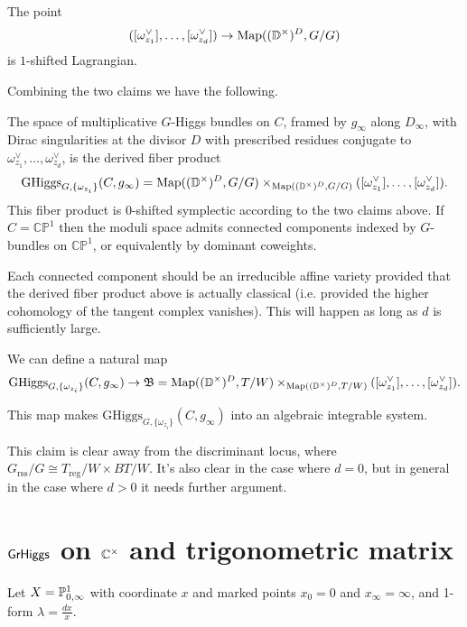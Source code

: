 \documentclass[12pt,psamsfonts,reqno]{amsart}
\begin{document}
\begin{claim}
The point 
\[([\omega_{z_1}^\vee], \ldots, [\omega_{z_d}^\vee]) \to \operatorname{Map}((\mathbb{D}^\times)^D, G/G)\]
is $1$-shifted Lagrangian.
\end{claim}

Combining the two claims we have the following.

\begin{definition}
The space of multiplicative $G$-Higgs bundles on $C$, framed by $g_\infty$ along $D_\infty$, with Dirac singularities at the divisor $D$ with prescribed residues conjugate to $\omega_{z_1}^\vee, \ldots, \omega_{z_d}^\vee$, is the derived fiber product
\[\mathrm{GHiggs}_{G, \{\omega_{z_i}\}}(C, g_\infty) =  \operatorname{Map}((\mathbb{D}^\times)^D, G/G) \times_{\operatorname{Map}((\mathbb{D}^\times)^D, G/G)} ([\omega_{z_1}^\vee], \ldots, [\omega_{z_d}^\vee]).\]
This fiber product is 0-shifted symplectic according to the two claims above.  If $C = \mathbb{CP}^1$ then the moduli space admits connected components indexed by $G$-bundles on $\mathbb{CP}^1$, or equivalently by dominant coweights.
\end{definition}

Each connected component should be an irreducible affine variety provided that the derived fiber product above is actually classical (i.e. provided the higher cohomology of the tangent complex vanishes).  This will happen as long as $d$ is sufficiently large.

We can define a natural map
\[\mathrm{GHiggs}_{G, \{\omega_{z_i}\}}(C, g_\infty) \to \mathfrak{B} =  \operatorname{Map}((\mathbb{D}^\times)^D, T/W) \times_{\operatorname{Map}((\mathbb{D}^\times)^D, T/W)} ([\omega_{z_1}^\vee], \ldots, [\omega_{z_d}^\vee]).\]

\begin{claim}
This map makes $\mathrm{GHiggs}_{G, \{\omega_{z_i}\}}(C, g_\infty)$ into an algebraic integrable system.
\end{claim}

This claim is clear away from the discriminant locus, where $G_{\mathrm{rss}}/G \cong T_{\mathrm{reg}}/W \times BT/W$.  It's also clear in the case where $d=0$, but in general in the case where $d > 0$ it needs further argument.


\section{$\mathsf{GrHiggs}$ on $\mathbb C^{\times}$ and trigonometric matrix}

Let $X = \mathbb P^{1}_{0,\infty}$ with coordinate $x$ and marked points  $x_0 = 0$ and $x_\infty =\infty$, and 1-form  $\lambda = \frac{dx}{x}$.
\end{document}
